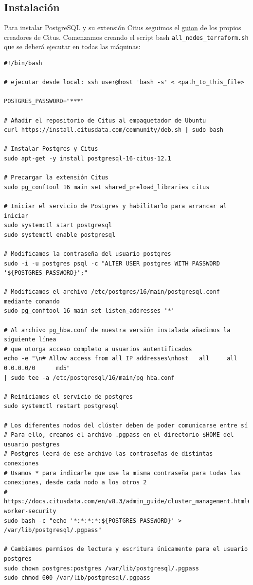 \subsection*{Instalación}

Para instalar PostgreSQL y su extensión Citus seguimos el \href{https://docs.citusdata.com/en/stable/installation/multi_node_debian.html#ubuntu-or-debian}{guion} de los propios creadores de Citus. Comenzamos creando el script bash \texttt{all\_nodes\_terraform.sh} que se deberá ejecutar en todas las máquinas:

\begin{verbatim}
#!/bin/bash

# ejecutar desde local: ssh user@host 'bash -s' < <path_to_this_file>

POSTGRES_PASSWORD="***"

# Añadir el repositorio de Citus al empaquetador de Ubuntu
curl https://install.citusdata.com/community/deb.sh | sudo bash

# Instalar Postgres y Citus
sudo apt-get -y install postgresql-16-citus-12.1

# Precargar la extensión Citus
sudo pg_conftool 16 main set shared_preload_libraries citus

# Iniciar el servicio de Postgres y habilitarlo para arrancar al iniciar
sudo systemctl start postgresql
sudo systemctl enable postgresql

# Modificamos la contraseña del usuario postgres
sudo -i -u postgres psql -c "ALTER USER postgres WITH PASSWORD '${POSTGRES_PASSWORD}';"

# Modificamos el archivo /etc/postgres/16/main/postgresql.conf mediante comando
sudo pg_conftool 16 main set listen_addresses '*'

# Al archivo pg_hba.conf de nuestra versión instalada añadimos la siguiente línea
# que otorga acceso completo a usuarios autentificados
echo -e "\n# Allow access from all IP addresses\nhost   all     all     0.0.0.0/0      md5" 
| sudo tee -a /etc/postgresql/16/main/pg_hba.conf

# Reiniciamos el servicio de postgres
sudo systemctl restart postgresql

# Los diferentes nodos del clúster deben de poder comunicarse entre sí
# Para ello, creamos el archivo .pgpass en el directorio $HOME del usuario postgres
# Postgres leerá de ese archivo las contraseñas de distintas conexiones
# Usamos * para indicarle que use la misma contraseña para todas las conexiones, desde cada nodo a los otros 2
# https://docs.citusdata.com/en/v8.3/admin_guide/cluster_management.html#increasing-worker-security
sudo bash -c "echo '*:*:*:*:${POSTGRES_PASSWORD}' > /var/lib/postgresql/.pgpass"

# Cambiamos permisos de lectura y escritura únicamente para el usuario postgres
sudo chown postgres:postgres /var/lib/postgresql/.pgpass
sudo chmod 600 /var/lib/postgresql/.pgpass
\end{verbatim}

